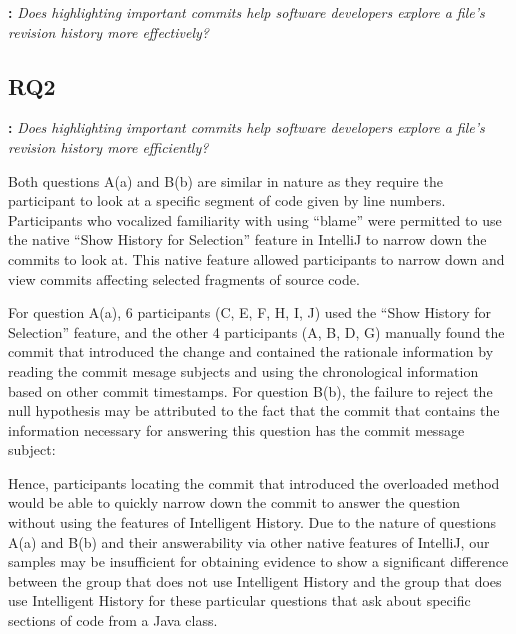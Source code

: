 \textbf{:} 
\textit{Does highlighting important commits help software developers explore a file’s revision history more effectively?}

\subsection{RQ2}

\textbf{:} 
\textit{Does highlighting important commits help software developers explore a file’s revision history more efficiently?}

Both questions A(a) and B(b) are similar in nature as they require the participant to look at a specific segment of code given by line numbers.
Participants who vocalized familiarity with using  ``blame'' were permitted to use the native ``Show History for Selection'' feature in IntelliJ to narrow down the commits to look at.
This native feature allowed participants to narrow down and view commits affecting selected fragments of source code.

For question A(a), 6 participants (C, E, F, H, I, J) used the ``Show History for Selection'' feature,
and the other 4 participants (A, B, D, G) manually found the commit that introduced the change and contained the rationale information by reading the commit mesage subjects and using the chronological information based on other commit timestamps.
For question B(b), the failure to reject the null hypothesis may be attributed to the fact that the commit  that contains the information necessary for answering this question has the commit message subject: 

\begin{center}
\end{center}

Hence, participants locating the commit that introduced the overloaded  method would be able to quickly narrow down the commit
to answer the question without using the features of Intelligent History.
Due to the nature of questions A(a) and B(b) and their answerability via other native features of IntelliJ, our samples may be insufficient for obtaining evidence to show a significant difference between the group that does not use Intelligent History and the group that does use Intelligent History for these particular questions that ask about specific sections of code from a Java class.

